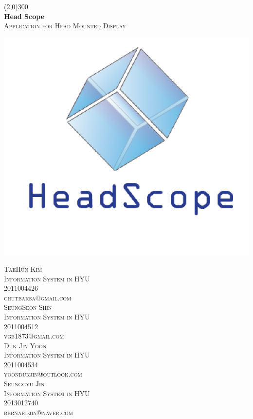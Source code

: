 \documentclass[12pt]{article}
\begin{document}
\begin{titlepage}
\begin{center}
\line(2,0){300}\\	
\huge{\bfseries Head Scope} \\
\textsc{\large Application for Head Mounted Display}\\[2\baselineskip]
\end{center} 

\center
\includegraphics{TeamName}
\\ [9\baselineskip]



\begin{multicols}{2} \noindent 
\textsc {\noindent TaeHun Kim\\ 
Information System in HYU \\
 2011004426 \\ 
 chutbaksa@gmail.com}\\[1\baselineskip]
\textsc{SeungSeon Shin \\
 Information System in HYU 
 \\ 2011004512 \\ 
 vgb1873@gmail.com}\\[1\baselineskip]
\textsc{Duk Jin Yoon \\
Information System in HYU \\
2011004534 \\
yoondukjin@outlook.com} \\[1\baselineskip]
\textsc{Seunggyu Jin \\ 
Information System in HYU \\
2013012740 \\
bernardjin@naver.com}
\end{multicols}
\end{titlepage}
\end{document}
